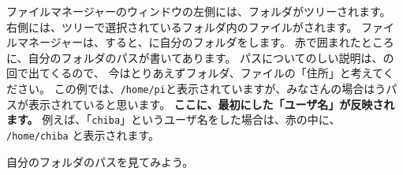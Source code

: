 

ファイルマネージャーのウィンドウの左側には、フォルダがツリーされます。
右側には、ツリーで選択されているフォルダ内のファイルがされます。
ファイルマネージャーは、すると、に自分のフォルダをします。
赤で囲まれたところに、自分のフォルダのパスが書いてあります。
パスについてのしい説明は、の回で出てくるので、
今はとりあえずフォルダ、ファイルの「住所」と考えてください。
この例では、\verb|/home/pi|と表示されていますが、みなさんの場合はうパスが表示されていると思います。
\textbf{\color{red}ここに、最初にした「ユーザ名」が反映されます。}
例えば、「\verb|chiba|」というユーザ名をした場合は、赤の中に、
\verb|/home/chiba| と表示されます。
\vspace{20pt}

\begin{tcolorbox}[title=\useOmetoi,breakable]
  自分のフォルダのパスを見てみよう。
  \begin{enumerate}
  \end{enumerate}
\end{tcolorbox}
\clearpage



